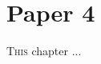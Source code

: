 \chapter{Paper 4}

\vspace*{-2.2em}
\minitoc
\vspace*{0.8em}

\lettrine[lines=3]{T}{his} chapter ...




